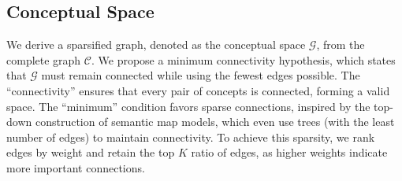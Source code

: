 

\subsection{Conceptual Space}
\label{Sec: CS}
We derive a sparsified graph, denoted as the conceptual space $\mathcal{G}$, from the complete graph $\mathcal{C}$. We propose a minimum connectivity hypothesis, which states that $\mathcal{G}$ must remain connected while using the fewest edges possible. The ``connectivity'' ensures that every pair of concepts is connected, forming a valid space. The ``minimum'' condition favors sparse connections, inspired by the top-down construction of semantic map models, which even use trees (with the least number of edges) to maintain connectivity. To achieve this sparsity, we rank edges by weight and retain the top $K$ ratio of edges, as higher weights indicate more important connections.

